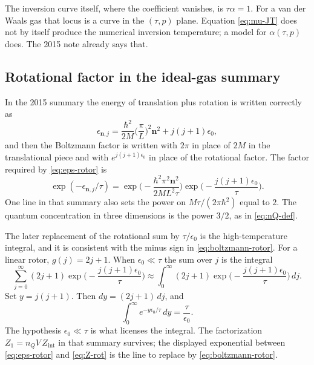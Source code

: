 The inversion curve itself, where the coefficient vanishes, is \(\tau\alpha = 1\). For a van der Waals gas that locus is a curve in the \((\tau,p)\) plane. Equation \eqref{eq:mu-JT} does not by itself produce the numerical inversion temperature; a model for \(\alpha(\tau,p)\) does. The 2015 note already says that.

\subsection{Rotational factor in the ideal-gas summary}
\label{sec:rotation}

In the 2015 summary the energy of translation plus rotation is written correctly as
\begin{equation}
\label{eq:eps-rotor}
\epsilon_{\mathbf{n},j}
= \frac{\hbar^2}{2M}\biggl(\frac{\pi}{L}\biggr)^{2}\mathbf{n}^{2} + j(j+1)\epsilon_0,
\end{equation}
and then the Boltzmann factor is written with \(2\pi\) in place of \(2M\) in the translational piece and with \(e^{j(j+1)\epsilon_0}\) in place of the rotational factor. The factor required by \eqref{eq:eps-rotor} is
\begin{equation}
\label{eq:boltzmann-rotor}
\exp(-\epsilon_{\mathbf{n},j}/\tau)
= \exp\Biggl(-\frac{\hbar^2 \pi^2 \mathbf{n}^{2}}{2M L^2\tau}\Biggr)
  \exp\biggl(-\frac{j(j+1)\epsilon_0}{\tau}\biggr).
\end{equation}
One line in that summary also sets the power on \(M\tau/(2\pi\hbar^2)\) equal to \(2\). The quantum concentration in three dimensions is the power \(3/2\), as in \eqref{eq:nQ-def}.

The later replacement of the rotational sum by \(\tau/\epsilon_0\) is the high-temperature integral, and it is consistent with the minus sign in \eqref{eq:boltzmann-rotor}. For a linear rotor, \(g(j) = 2j+1\). When \(\epsilon_0\ll\tau\) the sum over \(j\) is the integral
\begin{equation}
\label{eq:Z-rot-integral}
\sum_{j=0}^{\infty} (2j+1)\exp\biggl(-\frac{j(j+1)\epsilon_0}{\tau}\biggr)
\approx \int_{0}^{\infty} (2j+1)\exp\biggl(-\frac{j(j+1)\epsilon_0}{\tau}\biggr)\, dj.
\end{equation}
Set \(y = j(j+1)\). Then \(dy = (2j+1)\, dj\), and
\begin{equation}
\label{eq:Z-rot}
\int_{0}^{\infty} e^{-y\epsilon_0/\tau}\, dy = \frac{\tau}{\epsilon_0}.
\end{equation}
The hypothesis \(\epsilon_0\ll\tau\) is what licenses the integral. The factorization \(Z_1 = n_Q V\, Z_{\mathrm{int}}\) in that summary survives; the displayed exponential between \eqref{eq:eps-rotor} and \eqref{eq:Z-rot} is the line to replace by \eqref{eq:boltzmann-rotor}.

